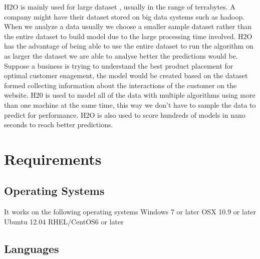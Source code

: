 \documentclass[9pt,twocolumn,twoside]{../../styles/osajnl}
\begin{document}
\cite{www-h2oyoutubevideo}H2O \CE is mainly used for large dataset ,
usually in the range of terrabytes.  A company might have their dataset
stored on big data systems such as hadoop.  When we analyze a data \GE usually we choose a
smaller sample dataset rather than the entire dataset to build model
due to the large processing time involved. H2O has the advantage of
being able to use the entire dataset to run the algorithm on as larger
the dataset we are able to analyse better the predictions would
be. Suppose a business is trying to understand the best product
placement for optimal customer enagement, the model would be created
based on the dataset formed collecting information about the
interactions of the customer on the website. \GE H20 is used to model
all of the data with multiple algorithms using more than one machine
at the same time, this way we don’t have to sample the data to predict
for performance.  H2O is also used
to score hundreds of models in nano seconds to reach better
predictions. 

\section{Requirements}

\subsection{Operating Systems}
\cite{www-h2o-requirements}
It works on the following operating systems 
\newline Windows 7 or later
\newline OSX 10.9 or later
\newline Ubuntu 12.04
\newline RHEL/CentOS6 or later

\subsection{Languages}
\end{document}
